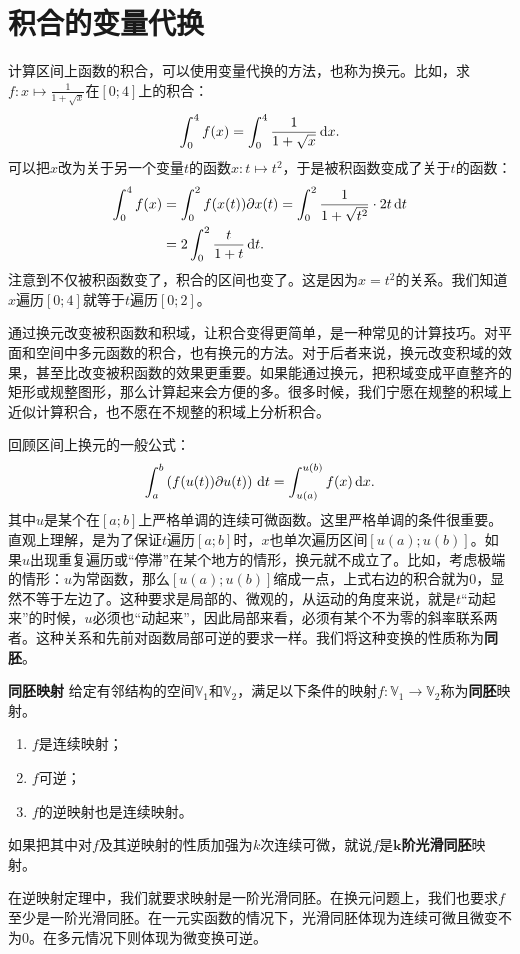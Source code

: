 \documentclass[12pt,UTF8]{ctexbook}
\begin{document}
\section{积合的变量代换}
计算区间上函数的积合，可以使用变量代换的方法，也称为换元。比如，求$f:x\mapsto \frac{1}{1+\sqrt{x}}$在$[0;4]$上的积合：
$$ \int_0^4 f(x) = \int_0^4 \frac{1}{1+\sqrt{x}}\,\mathrm{d}x.$$
可以把$x$改为关于另一个变量$t$的函数$x : t\mapsto t^2$，于是被积函数变成了关于$t$的函数：
\begin{align*}
    \int_0^4 f(x) &= \int_0^2 f(x(t))\partial x(t) = \int_0^2 \frac{1}{1+\sqrt{t^2}}\cdot 2t\,\mathrm{d}t \\
    &= 2\int_0^2 \frac{t}{1+t}\,\mathrm{d}t.
\end{align*}
注意到不仅被积函数变了，积合的区间也变了。这是因为$x = t^2$的关系。我们知道$x$遍历$[0;4]$就等于$t$遍历$[0;2]$。

通过换元改变被积函数和积域，让积合变得更简单，是一种常见的计算技巧。对平面和空间中多元函数的积合，也有换元的方法。对于后者来说，换元改变积域的效果，甚至比改变被积函数的效果更重要。如果能通过换元，把积域变成平直整齐的矩形或规整图形，那么计算起来会方便的多。很多时候，我们宁愿在规整的积域上近似计算积合，也不愿在不规整的积域上分析积合。

回顾区间上换元的一般公式：
$$ \int_a^b \left( f(u(t)) \partial u (t) \right)\,\mathrm{d}t = \int_{u(a)}^{u(b)} f(x)\,\mathrm{d}x.$$
其中$u$是某个在$[a;b]$上严格单调的连续可微函数。这里严格单调的条件很重要。直观上理解，是为了保证$t$遍历$[a;b]$时，$x$也单次遍历区间$[u(a);u(b)]$。如果$u$出现重复遍历或“停滞”在某个地方的情形，换元就不成立了。比如，考虑极端的情形：$u$为常函数，那么$[u(a);u(b)]$缩成一点，上式右边的积合就为$0$，显然不等于左边了。这种要求是局部的、微观的，从运动的角度来说，就是$t$“动起来”的时候，$u$必须也“动起来”，因此局部来看，必须有某个不为零的斜率联系两者。这种关系和先前对函数局部可逆的要求一样。我们将这种变换的性质称为\textbf{同胚}。
\begin{df}{\textbf{同胚映射}}
    给定有邻结构的空间$\mathbb{V}_1$和$\mathbb{V}_2$，满足以下条件的映射$f:\mathbb{V}_1\rightarrow\mathbb{V}_2$称为\textbf{同胚}映射。
    \begin{enumerate}[label=\arabic*.]
        \item $f$是连续映射；
        \item $f$可逆；
        \item $f$的逆映射也是连续映射。
    \end{enumerate}
    如果把其中对$f$及其逆映射的性质加强为$k$次连续可微，就说$f$是$\boldsymbol{k}$\textbf{阶光滑同胚}映射。
\end{df}
在逆映射定理中，我们就要求映射是一阶光滑同胚。在换元问题上，我们也要求$f$至少是一阶光滑同胚。在一元实函数的情况下，光滑同胚体现为连续可微且微变不为$0$。在多元情况下则体现为微变换可逆。
\end{document}
